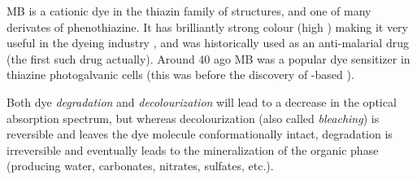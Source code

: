 \documentclass[draft,webedition,openright,titles,swedish,english]{LuaUUThesis}\usepackage[]{graphicx}\usepackage[]{xcolor}
\newcommand{\etc}{etc.}
\begin{document}
\gls{MB} is a cationic dye in the thiazin family of structures, and one of many
derivates of phenothiazine. It has brilliantly strong colour (high )
making it very useful in the dyeing industry \cite{Tayade2009}, and was historically
used as an anti-malarial drug (the first such drug actually).
Around \qty{40}{\years} ago \gls{MB} was a popular dye sensitizer in thiazine
photogalvanic cells \cite{Mills1999}
(this was before the discovery of -based ).

Both dye \emph{degradation} and \emph{decolourization} will lead to a decrease in the optical
absorption spectrum, but whereas decolourization (also called \emph{bleaching}) is reversible
and leaves the dye molecule conformationally intact, degradation is irreversible and
eventually leads to the mineralization of the organic phase
(producing water, carbonates, nitrates, sulfates, \etc).
\end{document}
